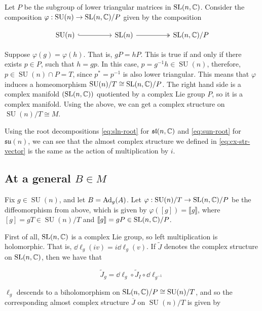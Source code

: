 \documentclass{article}
\DeclareMathOperator{\SU}{SU}
\newcommand{\su}{\mathfrak{su}}
\renewcommand{\sl}{\mathfrak{sl}}
\renewcommand{\tilde}{\widetilde}
\begin{document}
\label{sec:cx-quot}

Let \(P\) be the subgroup of lower triangular matrices in \(\operatorname{SL}(n, \mathbb{C})\). Consider the composition \(\varphi : \SU(n) \to \SL(n, \C)/P\) given by the composition 

\[\begin{tikzcd}
	{\SU(n)} && {\SL(n)} && {\SL(n, \C)/P}
	\arrow[hook, from=1-1, to=1-3]
	\arrow[two heads, from=1-3, to=1-5]
\end{tikzcd}\]

Suppose \(\varphi(g) = \varphi(h)\). That is, \(gP = hP\). This is true if and only if there exists \(p \in P\), such that \(h = gp\). In this case, \(p = g^{-1}h \in \SU(n)\), therefore, \(p \in \SU(n) \cap P = T\), since \(p^* = p^{-1}\) is also lower triangular. This means that \(\varphi\) induces a homeomorphism \(\SU(n)/T \cong \SL(n, \C)/P\). The right hand side is a complex manifold \((\operatorname{SL}(n, \mathbb{C}))\) quotiented by a complex Lie group \(P\), so it is a complex manifold. Using the above, we can get a complex structure on \(\SU(n)/T \cong M\).

Using the root decompositions \cref{eq:sln-root} for \(\sl(n, \C)\) and \cref{eq:sun-root} for \(\su(n)\), we can see that the almost complex structure we defined in \cref{eq:cx-str-vector} is the same as the action of multiplication by \(i\).

\subsection{At a general \(B \in M\)}

Fix \(g \in \SU(n)\), and let \(B = \operatorname{Ad}_g(A)\). Let \(\varphi : \SU(n)/T \to \SL(n, \C)/P\) be the diffeomorphism from above, which is given by \(\varphi([g]) = \llbracket g\rrbracket\), where \([g] = gT \in \SU(n)/T\) and \(\llbracket g \rrbracket = gP \in \operatorname{SL}(n, \mathbb{C})/P\).

First of all, \(\operatorname{SL}(n, \mathbb{C})\) is a complex Lie group, so left multiplication is holomorphic. That is, \(\dd \ell_g(iv) = i\dd\ell_g(v)\). If \(\tilde J\) denotes the complex structure on \(\operatorname{SL}(n, \mathbb{C})\), then we have that

\[\tilde J_g = \dd \ell_g \circ \tilde J_I \circ \dd\ell_{g^{-1}}\]

\(\ell_g\) descends to a biholomorphism on \(\SL(n, \C)/P \cong \SU(n)/T\), and so the corresponding almost complex structure \(\overline J\) on \(\SU(n)/T\) is given by
\end{document}

